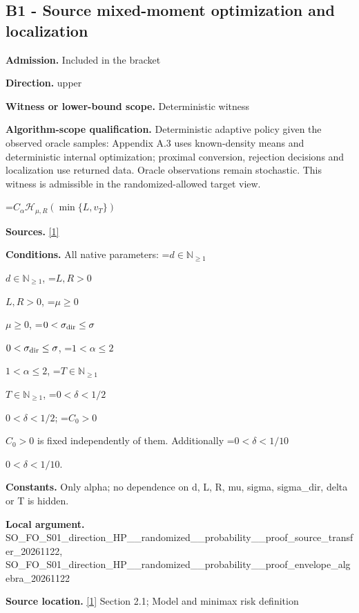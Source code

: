 \documentclass[10pt,a4paper]{article}
\newcommand{\AtlasMath}[1]{\par\begingroup\centering\setbox0=\hbox{$\displaystyle #1$}\ifdim\wd0>1.4\linewidth\typeout{ATLAS WIDE FORMULA: \the\wd0}\fi\ifdim\wd0>\linewidth\resizebox{\linewidth}{!}{\box0}\else\box0\fi\par\endgroup}
\newcommand{\AtlasInlineMath}[1]{\begingroup\setbox0=\hbox{$#1$}\ifdim\wd0>.4\linewidth\endgroup\AtlasMath{#1}\else\endgroup$#1$\fi}
\begin{document}
\subsection{B1 - Source mixed-moment optimization and localization}


\textbf{Admission.} Included in the bracket



\textbf{Direction.} upper



\textbf{Witness or lower-bound scope.} Deterministic witness



\textbf{Algorithm-scope qualification.} Deterministic adaptive policy given the observed oracle samples: Appendix A.3 uses known-density means and deterministic internal optimization; proximal conversion, rejection decisions and localization use returned data. Oracle observations remain stochastic. This witness is admissible in the randomized-allowed target view.



\AtlasMath{C_\alpha\mathcal H_{\mu,R}(\min\{L,v_T\})}


\textbf{Sources.} \href{https://arxiv.org/html/2610.00260v2}{[1]}



\textbf{Conditions.} All native parameters: \AtlasInlineMath{d\in\mathbb N_{\ge1}}, \AtlasInlineMath{L,R>0}, \AtlasInlineMath{\mu\ge0}, \AtlasInlineMath{0<\sigma_{\rm dir}\le\sigma}, \AtlasInlineMath{1<\alpha\le2}, \AtlasInlineMath{T\in\mathbb N_{\ge1}}, \AtlasInlineMath{0<\delta<1/2}; \AtlasInlineMath{C_0>0} is fixed independently of them. Additionally \AtlasInlineMath{0<\delta<1/10}.



\textbf{Constants.} Only alpha; no dependence on d, L, R, mu, sigma, sigma\_dir, delta or T is hidden.



\textbf{Local argument.} SO\_FO\_S01\_direction\_HP\_\_\allowbreak{}randomized\_\_probability\_\allowbreak{}\_proof\_source\_transfer\_2\allowbreak{}0261122, SO\_FO\_S01\_direction\_HP\_\_\allowbreak{}randomized\_\_probability\_\allowbreak{}\_proof\_envelope\_algebra\_\allowbreak{}20261122



\textbf{Source location.} \href{https://arxiv.org/html/2610.00260v2}{[1]} Section 2.1; Model and minimax risk definition
\end{document}

